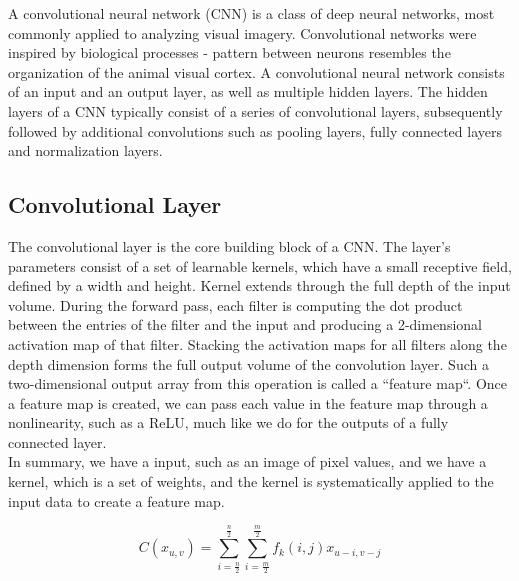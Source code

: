A convolutional neural network (CNN) is a class of deep neural networks, most commonly applied to analyzing visual imagery. Convolutional networks were inspired by biological processes - pattern between neurons resembles the organization of the animal visual cortex. A convolutional neural network consists of an input and an output layer, as well as multiple hidden layers. The hidden layers of a CNN typically consist of a series of convolutional layers, subsequently followed by additional convolutions such as pooling layers, fully connected layers and normalization layers.\\

\subsection{Convolutional Layer}
The convolutional layer is the core building block of a CNN. The layer's parameters consist of a set of learnable kernels, which have a small receptive field, defined by a width and height. Kernel extends through the full depth of the input volume. During the forward pass, each filter is computing the dot product between the entries of the filter and the input and producing a 2-dimensional activation map of that filter. Stacking the activation maps for all filters along the depth dimension forms the full output volume of the convolution layer. Such a two-dimensional output array from this operation is called a “feature map“. Once a feature map is created, we can pass each value in the feature map through a nonlinearity, such as a ReLU, much like we do for the outputs of a fully connected layer.\\
In summary, we have a input, such as an image of pixel values, and we have a kernel, which is a set of weights, and the kernel is systematically applied to the input data to create a feature map.\\

\begin{large}
    $$C(x_{u,v}) = \sum_{i = \frac{n}{2}}^{\frac{n}{2}} \sum_{i = \frac{m}{2}}^{\frac{m}{2}} f_{k}(i, j)x_{u-i,v-j} $$
\end{large}

